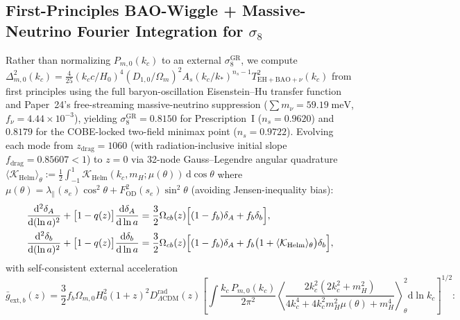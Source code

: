 \documentclass[11pt,a4paper]{article}
\begin{document}
\subsection{First-Principles BAO-Wiggle + Massive-Neutrino Fourier Integration for \texorpdfstring{$\sigma_8$}{sigma\_8}}
Rather than normalizing $P_{m,0}(k_c)$ to an external $\sigma_8^{\mathrm{GR}}$, we compute $\Delta_{m,0}^2(k_c) = \frac{4}{25}(k_c c/H_0)^4\allowbreak(D_{1,0}/\Omega_m)^2 A_s(k_c/k_*)^{n_s-1}T_{\mathrm{EH+BAO}+\nu}^2(k_c)$ from first principles using the full baryon-oscillation Eisenstein--Hu transfer function \cite{EisensteinHu1998} and Paper~24's free-streaming massive-neutrino suppression ($\sum m_\nu = 59.19\;\mathrm{meV}$, $f_\nu = 4.44\times 10^{-3}$), yielding $\sigma_8^{\mathrm{GR}} = \mathbf{0.8150}$ for Prescription~I ($n_s = 0.9620$) and $\mathbf{0.8179}$ for the COBE-locked two-field minimax point ($n_s = 0.9722$). Evolving each mode from $z_{\mathrm{drag}} = 1060$ (with radiation-inclusive initial slope $f_{\mathrm{drag}} = 0.85607 < 1$) to $z = 0$ via 32-node Gauss--Legendre angular quadrature $\langle\mathcal{K}_{\mathrm{Helm}}\rangle_\theta := \frac{1}{2}\int_{-1}^1 \mathcal{K}_{\mathrm{Helm}}(k_c, m_H; \mu(\theta))\,\mathrm{d}\cos\theta$ where $\mu(\theta) = \lambda_\parallel(s_e)\cos^2\theta + F_{\mathrm{OD}}^2(s_e)\sin^2\theta$ (avoiding Jensen-inequality bias):
\begin{equation}
\begin{aligned}
  \frac{\mathrm{d}^2\delta_A}{\mathrm{d}(\ln a)^2} + \bigl[1 - q(z)\bigr]\frac{\mathrm{d}\delta_A}{\mathrm{d}\ln a} &= \frac{3}{2}\Omega_{cb}(z)\Bigl[(1 - f_b)\delta_A + f_b\delta_b\Bigr], \\
  \frac{\mathrm{d}^2\delta_b}{\mathrm{d}(\ln a)^2} + \bigl[1 - q(z)\bigr]\frac{\mathrm{d}\delta_b}{\mathrm{d}\ln a} &= \frac{3}{2}\Omega_{cb}(z)\Bigl[(1 - f_b)\delta_A + f_b\bigl(1 + \langle\mathcal{K}_{\mathrm{Helm}}\rangle_\theta\bigr)\delta_b\Bigr],
\end{aligned}
\label{eq:2fluid-ode}
\end{equation}
with self-consistent external acceleration
\begin{equation}
  \bar{g}_{\mathrm{ext},b}(z) = \frac{3}{2}f_b\Omega_{m,0}H_0^2(1+z)^2 D_{\Lambda\mathrm{CDM}}^{\mathrm{rad}}(z)\left[\int \frac{k_c\,P_{m,0}(k_c)}{2\pi^2}\left\langle\frac{2k_c^2(2k_c^2 + m_H^2)}{4k_c^4 + 4k_c^2 m_H^2\mu(\theta) + m_H^4}\right\rangle_{\!\theta}^{\!2}\mathrm{d}\ln k_c\right]^{1/2}:
  \label{eq:self-consistent-barefe}
\end{equation}
\end{document}
